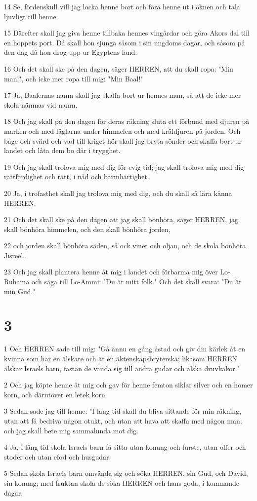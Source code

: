 \par 14 Se, fördenskull vill jag locka henne bort och föra henne ut i öknen och tala ljuvligt till henne.
\par 15 Därefter skall jag giva henne tillbaka hennes vingårdar och göra Akors dal till en hoppets port. Då skall hon sjunga såsom i sin ungdoms dagar, och såsom på den dag då hon drog upp ur Egyptens land.
\par 16 Och det skall ske på den dagen, säger HERREN, att du skall ropa: "Min man!", och icke mer ropa till mig: "Min Baal!"
\par 17 Ja, Baalernas namn skall jag skaffa bort ur hennes mun, så att de icke mer skola nämnas vid namn.
\par 18 Och jag skall på den dagen för deras räkning sluta ett förbund med djuren på marken och med fåglarna under himmelen och med kräldjuren på jorden. Och båge och svärd och vad till kriget hör skall jag bryta sönder och skaffa bort ur landet och låta dem bo där i trygghet.
\par 19 Och jag skall trolova mig med dig för evig tid; jag skall trolova mig med dig rättfärdighet och rätt, i nåd och barmhärtighet.
\par 20 Ja, i trofasthet skall jag trolova mig med dig, och du skall så lära känna HERREN.
\par 21 Och det skall ske på den dagen att jag skall bönhöra, säger HERREN, jag skall bönhöra himmelen, och den skall bönhöra jorden,
\par 22 och jorden skall bönhöra säden, så ock vinet och oljan, och de skola bönhöra Jisreel.
\par 23 Och jag skall plantera henne åt mig i landet och förbarma mig över Lo-Ruhama och säga till Lo-Ammi: "Du är mitt folk." Och det skall svara: "Du är min Gud."

\chapter{3}

\par 1 Och HERREN sade till mig: "Gå ännu en gång åstad och giv din kärlek åt en kvinna som har en älskare och är en äktenskapsbryterska; likasom HERREN älskar Israels barn, fastän de vända sig till andra gudar och älska druvkakor."
\par 2 Och jag köpte henne åt mig och gav för henne femton siklar silver och en homer korn, och därutöver en letek korn.
\par 3 Sedan sade jag till henne: "I lång tid skall du bliva sittande för min räkning, utan att få bedriva någon otukt, och utan att hava att skaffa med någon man; och jag skall bete mig sammalunda mot dig.
\par 4 Ja, i lång tid skola Israels barn få sitta utan konung och furste, utan offer och stoder och utan efod och husgudar.
\par 5 Sedan skola Israels barn omvända sig och söka HERREN, sin Gud, och David, sin konung; med fruktan skola de söka HERREN och hans goda, i kommande dagar.

